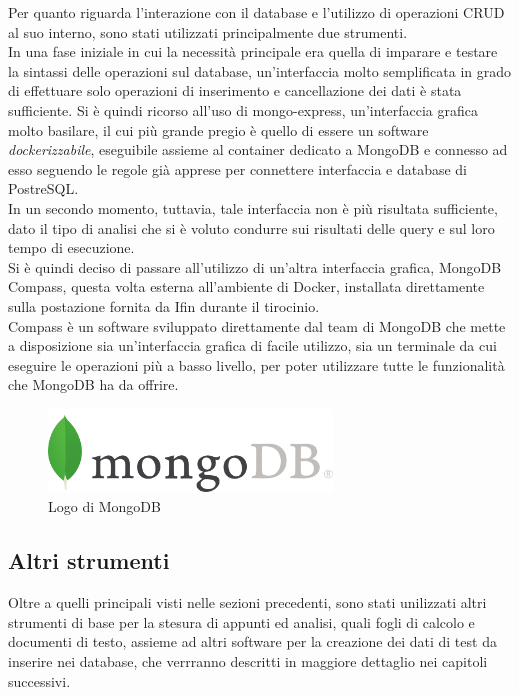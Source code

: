 \noindent Per quanto riguarda l'interazione con il database e l'utilizzo di \gls{operazioni CRUD} al suo interno, sono stati utilizzati principalmente due strumenti.\\ 
In una fase iniziale in cui la necessità principale era quella di imparare e testare la sintassi delle operazioni sul database, un'interfaccia molto semplificata in grado di effettuare solo operazioni di inserimento e cancellazione dei dati è stata sufficiente. Si è quindi ricorso all'uso di mongo-express, un'interfaccia grafica molto basilare, il cui più grande pregio è quello di essere un software \textit{dockerizzabile}, eseguibile assieme al container dedicato a MongoDB e connesso ad esso seguendo le regole già apprese per connettere interfaccia e database di PostreSQL.\\
In un secondo momento, tuttavia, tale interfaccia non è più risultata sufficiente, dato il tipo di analisi che si è voluto condurre sui risultati delle query e sul loro tempo di esecuzione.\\
Si è quindi deciso di passare all'utilizzo di un'altra interfaccia grafica, MongoDB Compass, questa volta esterna all'ambiente di Docker, installata direttamente sulla postazione fornita da Ifin durante il tirocinio.\\
Compass è un software sviluppato direttamente dal team di MongoDB che mette a disposizione sia un'interfaccia grafica di facile utilizzo, sia un terminale da cui eseguire le operazioni più a basso livello, per poter utilizzare tutte le funzionalità che MongoDB ha da offrire.

\begin{figure}[htbp]
\begin{center}
\includegraphics[height=6em]{immagini/tecnologies-logos/MongoDB-Logo.png}
\caption{Logo di MongoDB}
\end{center}
\end{figure}

\subsection{Altri strumenti}
Oltre a quelli principali visti nelle sezioni precedenti, sono stati unilizzati altri strumenti di base per la stesura di appunti ed analisi, quali fogli di calcolo e documenti di testo, assieme ad altri software per la creazione dei dati di test da inserire nei database, che verrranno descritti in maggiore dettaglio nei capitoli successivi.\\


